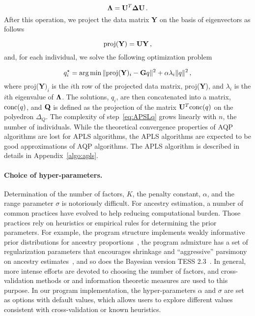 $$
{\bf \Lambda} = {\bf U}^T {\bf \Delta} {\bf U} \, .
$$
\noindent  After this operation, we project the data matrix {\bf Y} on the basis of eigenvectors as follows

$$
{\rm proj} ({\bf Y}) = {\bf U}{\bf Y} \, , 
$$
\noindent and, for each individual, we solve the following optimization problem

\begin{equation}
q_i^\star = \arg \min  \|  {\rm proj} ({\bf Y})_i  - {\bf G} q \|^2 + \alpha \lambda_i \| q \|^2  \, ,
\label{eq:APSLq}
\end{equation}
\noindent where proj({\bf Y}$)_i$ is the $i$th row of the projected data matrix,
proj({\bf Y}), and $\lambda_i$ is the $i$th eigenvalue of ${\bf \Lambda}$. The
solutions, $q_i$, are then concatenated into a matrix, ${\rm conc}(q)$, and
${\bf Q}$ is defined as the projection of the matrix ${\bf U}^T {\rm conc}(q)$
on the polyedron $\Delta_Q$. The complexity of step~\eqref{eq:APSLq} grows
linearly with $n$, the number of individuals. While the theoretical convergence
properties of AQP algorithms are lost for APLS algorithms, the APLS algorithms
are expected to be good approximations of AQP algorithms. The APLS algorithm is
described in details in Appendix~\ref{algo:apls}.


\paragraph{Choice of hyper-parameters.} Determination of the number of factors,
$K$, the penalty constant, $\alpha$, and the range parameter $\sigma$ is
notoriously difficult. For ancestry estimation, a number of common practices
have evolved to help reducing computational burden. Those practices rely on
heuristics or empirical rules for determining the prior parameters. For example,
the program structure implements weakly informative prior distributions for
ancestry proportions~\citep{wang2017}, the program admixture has a set of
regularization parameters that encourages shrinkage and “aggressive” parsimony
on ancestry estimates~\citep{Alexander2011}, and so does the Bayesian
version TESS 2.3~\citep{Durand2009}. In general, more intense efforts are
devoted to choosing the number of factors, and cross-validation methods or and
information theoretic measures are used to this purpose. In our program
implementation, the hyper-parameters $\alpha$ and $\sigma$ are set as options
with default values, which allows users to explore different values consistent
with cross-validation or known heuristics.

